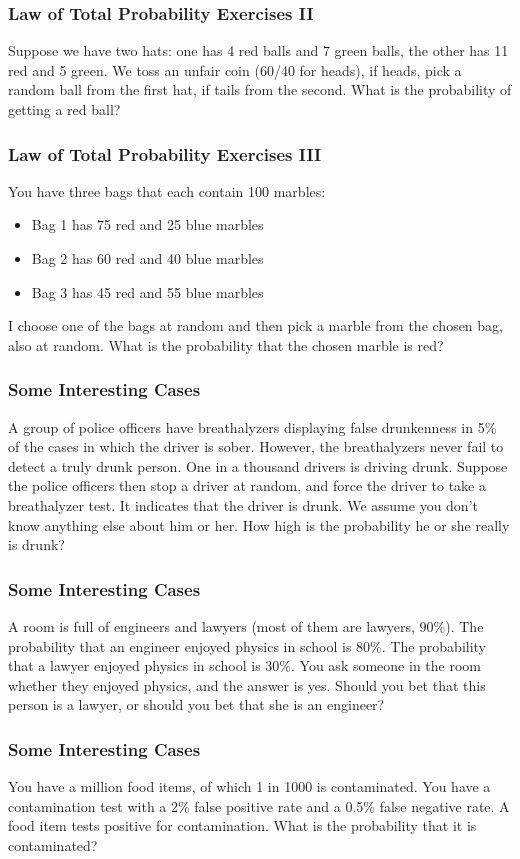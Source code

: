 \documentclass[xcolor=dvipsnames]{beamer}
\begin{document}
\begin{frame}
  \frametitle{Law of Total Probability Exercises II}
Suppose we have two hats: one has 4 red balls and 7 green balls,
the other has 11 red and 5 green. We toss an unfair coin (60/40 for
heads), if heads, pick a random ball from the first hat, if tails from
the second. What is the probability of getting a red ball?
\end{frame}

\begin{frame}
  \frametitle{Law of Total Probability Exercises III}
You have three bags that each contain 100 marbles:
\begin{itemize}
\item Bag 1 has 75 red and 25 blue marbles
\item Bag 2 has 60 red and 40 blue marbles
\item Bag 3 has 45 red and 55 blue marbles
\end{itemize}
I choose one of the bags at random and then pick a marble from the
chosen bag, also at random. What is the probability that the chosen
marble is red?
\end{frame}

\begin{frame}
  \frametitle{Some Interesting Cases}
  A group of police officers have breathalyzers displaying false
  drunkenness in 5\% of the cases in which the driver is sober.
  However, the breathalyzers never fail to detect a truly drunk
  person. One in a thousand drivers is driving drunk. Suppose the
  police officers then stop a driver at random, and force the driver
  to take a breathalyzer test. It indicates that the driver is drunk.
  We assume you don't know anything else about him or her. How high is
  the probability he or she really is drunk?
\end{frame}

\begin{frame}
  \frametitle{Some Interesting Cases}
  A room is full of engineers and lawyers (most of them are lawyers,
  90\%). The probability that an engineer enjoyed physics in school is
  80\%. The probability that a lawyer enjoyed physics in school is
  30\%. You ask someone in the room whether they enjoyed physics, and
  the answer is yes. Should you bet that this person is a lawyer, or
  should you bet that she is an engineer?
\end{frame}

\begin{frame}
  \frametitle{Some Interesting Cases}
You have a million food items, of which 1 in 1000 is contaminated. You
have a contamination test with a 2\% false positive rate and a 0.5\%
false negative rate. A food item tests positive for contamination.
What is the probability that it is contaminated?
\end{frame}
\end{document}
